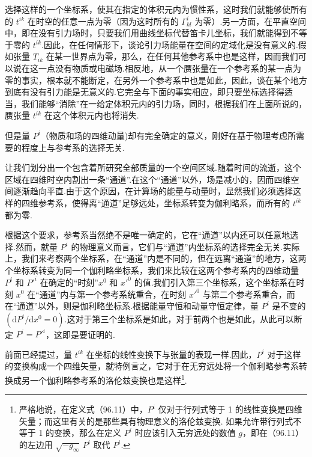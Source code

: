 选择这样的一个坐标系，使其在指定的体积元内为惯性系，这时我们就能够使所有的 $t^{ik}$ 在时空的任意一点为零（因为这时所有的 $\Gamma^i_{kl}$ 为零）.另一方面，在平直空间中，即在没有引力场时，只要我们用曲线坐标代替笛卡儿坐标，我们就能得到不等于零的 $t^{ik}$.因此，在任何情形下，谈论引力场能量在空间的定域化是没有意义的.假如张量 $T_{ik}$ 在某一世界点为零，那么，在任何其他参考系中也是这样，因而我们可以说在这一点没有物质或电磁场.相反地，从一个赝张量在一个参考系的某一点为零的事实，根本就不能断定，在另外一个参考系中也是如此，因此，谈在某个地方到底有没有引力能是无意义的.它完全与下面的事实相应，即只要坐标选择得适当，我们能够“消除”在一给定体积元内的引力场，同时，根据我们在上面所说的，赝张量 $t^{ik}$ 在这个体积元内也将消失.

但是量 $P^i$（物质和场的四维动量)却有完全确定的意义，刚好在基于物理考虑所需要的程度上与参考系的选择无关.

让我们划分出一个包含着所研究全部质量的一个空间区域.随着时间的流逝，这个区域在四维时空内割出一条“通道”.在这个“通道”以外，场是减小的，因而四维空间逐渐趋向平直.由于这个原因，在计算场的能量与动量时，显然我们必须选择这样的四维参考系，使得离“通道”足够远处，坐标系转变为伽利略系，而所有的 $t^{ik}$ 都为零.

根据这个要求，参考系当然绝不是唯一确定的，它在“通道”以内还可以任意地选择.然而，就量 $P^i$ 的物理意义而言，它们与“通道”内坐标系的选择完全无关.实际上，我们来考察两个坐标系，在“通道”内是不同的，但在远离“通道”的地方，这两个坐标系转变为同一个伽利略坐标系，我们来比较在这两个参考系内的四维动量 $P^i$ 和 $P'^i$ 在确定的“时刻”$x^0$ 和 $x'^0$ 的值.我们引入第三个坐标系，这个坐标系在时刻 $x^0$ 在“通道”内与第一个参考系统重合，在时刻 $x'^0$ 与第二个参考系重合，而在“通道”以外，则是伽利略坐标系.根据能量守恒和动量守恒定律，量 $P^i$ 是不变的 $(\mathrm{d}P^i/\mathrm{d}x^0=0)$.这对于第三个坐标系是如此，对于前两个也是如此，从此可以断定 $P^i=P'^i$，这即是要证明的.

前面已经提过，量 $t^{ik}$ 在坐标的线性变换下与张量的表现一样.因此，$P^i$ 对于这样的变换构成一个四维矢量，就特例言之，它对于在无穷远处将一个伽利略参考系转换成另一个伽利略参考系的洛伦兹变换也是这样\footnote{严格地说，在定义式（96.11）中，$P^i$ 仅对于行列式等于 1 的线性变换是四维矢量；而这里有关的是那些具有物理意义的洛伦兹变换. 如果允许带行列式不等于 1 的变换，那么在定义 $P^i$ 时应该引入无穷远处的数值 $g$，即在（96.11）的左边用 $\sqrt{-g_\infty}\,P^i$ 取代 $P^i$.}.

